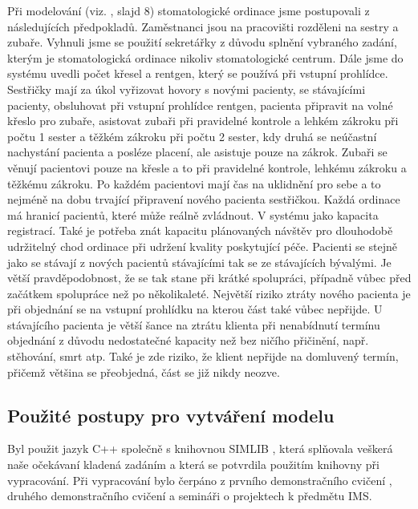 \documentclass[a4paper,11pt,titlepage]{article}
\begin{document}
Při modelování (viz. \cite{ims}, slajd 8) stomatologické ordinace jsme postupovali z následujících předpokladů. Zaměstnanci jsou na pracovišti rozděleni na sestry a zubaře. Vyhnuli jsme se použití sekretářky z důvodu splnění vybraného zadání, kterým je stomatologická ordinace nikoliv stomatologické centrum. Dále jsme do systému uvedli počet křesel a rentgen, který se používá při vstupní prohlídce.
\newline
Sestřičky mají za úkol vyřizovat hovory s novými pacienty, se stávajícími pacienty, obsluhovat při vstupní prohlídce rentgen, pacienta připravit na volné křeslo pro zubaře, asistovat zubaři při pravidelné kontrole a lehkém zákroku při počtu 1 sester a těžkém zákroku při počtu 2 sester, kdy druhá se neúčastní nachystání pacienta a posléze placení, ale asistuje pouze na zákrok.
\newline
Zubaři se věnují pacientovi pouze na křesle a to při pravidelné kontrole, lehkému zákroku a těžkému zákroku. Po každém pacientovi mají čas na uklidnění pro sebe a to nejméně na dobu trvající připravení nového pacienta sestřičkou.
\newline
Každá ordinace má hranicí pacientů, které může reálně zvládnout. V systému jako kapacita registrací. Také je potřeba znát kapacitu plánovaných návštěv pro dlouhodobě udržitelný chod ordinace při udržení kvality poskytující péče.
\newline
Pacienti se stejně jako se stávají z nových pacientů stávajícími tak se ze stávajících bývalými. Je větší pravděpodobnost, že se tak stane při krátké spolupráci, případně vůbec před začátkem spolupráce než po několikaleté. 
\newline
Největší riziko ztráty nového pacienta je při objednání se na vstupní prohlídku na kterou část také vůbec nepřijde. 
\newline
U stávajícího pacienta je větší šance na ztrátu klienta při nenabídnutí termínu objednání z důvodu nedostatečné kapacity než bez ničího přičinění, např. stěhování, smrt atp. Také je zde riziko, že klient nepřijde na domluvený termín, přičemž většina se přeobjedná, část se již nikdy neozve.

\subsection{Použité postupy pro vytváření modelu}

Byl použit jazyk C++ společně s knihovnou SIMLIB \cite{simlib}, která splňovala veškerá naše očekávaní kladená zadáním a která se potvrdila použitím knihovny při vypracování. Při vypracování bylo čerpáno z prvního demonstračního cvičení \cite{dem01}, druhého demonstračního cvičení\cite{dem02} a semináři o projektech \cite{seminar} k předmětu IMS.
\end{document}
